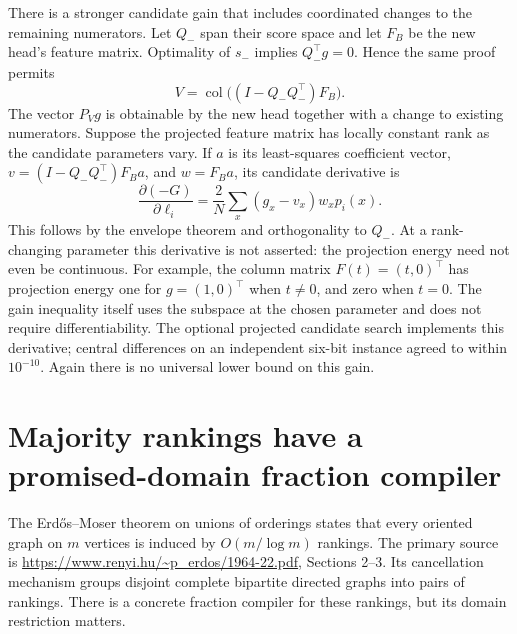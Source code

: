 \documentclass[11pt]{article}
\begin{document}
There is a stronger candidate gain that includes coordinated changes to
the remaining numerators. Let $Q_-$ span their score space and let
$F_B$ be the new head's feature matrix. Optimality of $s_-$ implies
$Q_-^{\top}g=0$. Hence the same proof permits
\[
 V=\operatorname{col}\bigl((I-Q_-Q_-^{\top})F_B\bigr).
\]
The vector $P_Vg$ is obtainable by the new head together with a change
to existing numerators. Suppose the projected feature matrix has
locally constant rank as the candidate parameters vary. If $a$ is its
least-squares coefficient vector,
$v=(I-Q_-Q_-^{\top})F_Ba$, and $w=F_Ba$, its candidate derivative is
\[
 \frac{\partial(-G)}{\partial\ell_i}
   =\frac2N\sum_x(g_x-v_x)w_xp_i(x).
\]
This follows by the envelope theorem and orthogonality to $Q_-$.
At a rank-changing parameter this derivative is not asserted: the
projection energy need not even be continuous. For example, the column
matrix $F(t)=(t,0)^{\top}$ has projection energy one for $g=(1,0)^{\top}$
when $t\ne0$, and zero when $t=0$. The gain inequality itself uses the
subspace at the chosen parameter and does not require differentiability.
The optional projected candidate search implements this derivative;
central differences on an independent six-bit instance agreed to
within $10^{-10}$. Again there is no universal lower bound on this gain.

\section{Majority rankings have a promised-domain fraction compiler}

The Erd\H{o}s--Moser theorem on unions of orderings states that every
oriented graph on $m$ vertices is induced by $O(m/\log m)$ rankings.
The primary source is \url{https://www.renyi.hu/~p_erdos/1964-22.pdf},
Sections 2--3. Its cancellation mechanism groups disjoint complete
bipartite directed graphs into pairs of rankings. There is a concrete
fraction compiler for these rankings, but its domain restriction matters.
\end{document}
